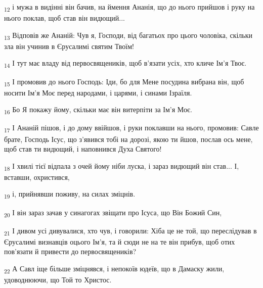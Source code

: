 \begin{tcolorbox}
\textsubscript{12} і мужа в видінні він бачив, на ймення Ананія, що до нього прийшов і руку на нього поклав, щоб став він видющий...
\end{tcolorbox}
\begin{tcolorbox}
\textsubscript{13} Відповів же Ананій: Чув я, Господи, від багатьох про цього чоловіка, скільки зла він учинив в Єрусалимі святим Твоїм!
\end{tcolorbox}
\begin{tcolorbox}
\textsubscript{14} І тут має владу від первосвящеників, щоб в'язати усіх, хто кличе Ім'я Твоє.
\end{tcolorbox}
\begin{tcolorbox}
\textsubscript{15} І промовив до нього Господь: Іди, бо для Мене посудина вибрана він, щоб носити Ім'я Моє перед народами, і царями, і синами Ізраїля.
\end{tcolorbox}
\begin{tcolorbox}
\textsubscript{16} Бо Я покажу йому, скільки має він витерпіти за Ім'я Моє.
\end{tcolorbox}
\begin{tcolorbox}
\textsubscript{17} І Ананій пішов, і до дому ввійшов, і руки поклавши на нього, промовив: Савле брате, Господь Ісус, що з'явився тобі на дорозі, якою ти йшов, послав ось мене, щоб став ти видющий, і наповнився Духа Святого!
\end{tcolorbox}
\begin{tcolorbox}
\textsubscript{18} І хвилі тієї відпала з очей йому ніби луска, і зараз видющий він став... І, вставши, охристився,
\end{tcolorbox}
\begin{tcolorbox}
\textsubscript{19} і, прийнявши поживу, на силах зміцнів.
\end{tcolorbox}
\begin{tcolorbox}
\textsubscript{20} І він зараз зачав у синагогах звіщати про Ісуса, що Він Божий Син,
\end{tcolorbox}
\begin{tcolorbox}
\textsubscript{21} І дивом усі дивувалися, хто чув, і говорили: Хіба це не той, що переслідував в Єрусалимі визнавців оцього Ім'я, та й сюди не на те він прибув, щоб отих пов'язати й привести до первосвящеників?
\end{tcolorbox}
\begin{tcolorbox}
\textsubscript{22} А Савл іще більше зміцнявся, і непокоїв юдеїв, що в Дамаску жили, удоводнюючи, що Той то Христос.
\end{tcolorbox}
